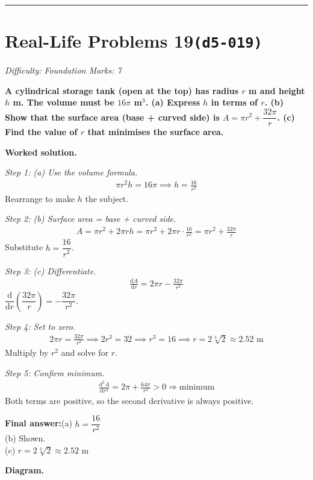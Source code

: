 \documentclass[11pt]{article}
\newcommand{\question}[1]{\par\medskip\noindent\textbf{#1}\par}
\begin{document}
\medskip\hrule

\section*{Real-Life Problems 19\quad\small\texttt{(d5-019)}}
\textit{Difficulty: Foundation \quad\textbar\quad Marks: 7}

\question{A cylindrical storage tank (open at the top) has radius \( r \) m and height \( h \) m. The volume must be \( 16\pi \) m\(^3\). (a) Express \( h \) in terms of \( r \). (b) Show that the surface area (base + curved side) is \( A = \pi r^2 + \dfrac{32\pi}{r} \). (c) Find the value of \( r \) that minimises the surface area.}

\textbf{Worked solution.}

\textit{Step 1: (a) Use the volume formula.}
\[\begin{gathered}
\pi r^2 h = 16\pi \implies h = \frac{16}{r^2}
\end{gathered}\]
Rearrange to make \( h \) the subject.

\textit{Step 2: (b) Surface area = base + curved side.}
\[\begin{gathered}
A = \pi r^2 + 2\pi r h = \pi r^2 + 2\pi r \cdot \frac{16}{r^2} = \pi r^2 + \frac{32\pi}{r}
\end{gathered}\]
Substitute \( h = \dfrac{16}{r^2} \).

\textit{Step 3: (c) Differentiate.}
\[\begin{gathered}
\frac{\mathrm{d}A}{\mathrm{d}r} = 2\pi r - \frac{32\pi}{r^2}
\end{gathered}\]
\( \dfrac{\mathrm{d}}{\mathrm{d}r}\left(\dfrac{32\pi}{r}\right) = -\dfrac{32\pi}{r^2} \).

\textit{Step 4: Set to zero.}
\[\begin{gathered}
2\pi r = \frac{32\pi}{r^2} \implies 2r^3 = 32 \implies r^3 = 16 \implies r = 2\sqrt[3]{2} \approx 2.52 \text{ m}
\end{gathered}\]
Multiply by \( r^2 \) and solve for \( r \).

\textit{Step 5: Confirm minimum.}
\[\begin{gathered}
\frac{\mathrm{d}^2A}{\mathrm{d}r^2} = 2\pi + \frac{64\pi}{r^3} > 0 \Rightarrow \text{minimum}
\end{gathered}\]
Both terms are positive, so the second derivative is always positive.

\begin{answerbox}
\textbf{Final answer:}\quad (a) \(\displaystyle  h = \dfrac{16}{r^2} \) \\[3pt]  (b) Shown. \\[3pt]  (c) \(\displaystyle  r = 2\sqrt[3]{2} \approx 2.52 \) m
\end{answerbox}
\textbf{Diagram.}
\end{document}
